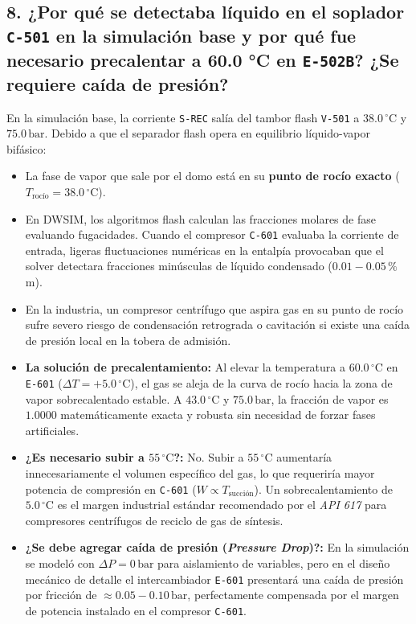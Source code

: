 \documentclass[11pt,a4paper]{article}
\begin{document}
\subsection{8. ¿Por qué se detectaba líquido en el soplador \texttt{C-501} en la simulación base y por qué fue necesario precalentar a 60.0 °C en \texttt{E-502B}? ¿Se requiere caída de presión?}
En la simulación base, la corriente \texttt{S-REC} salía del tambor flash \texttt{V-501} a $38.0\,^\circ\text{C}$ y $75.0\,\text{bar}$. Debido a que el separador flash opera en equilibrio líquido-vapor bifásico:
\begin{itemize}
    \item La fase de vapor que sale por el domo está en su \textbf{punto de rocío exacto} ($T_{\text{rocío}} = 38.0\,^\circ\text{C}$).
    \item En DWSIM, los algoritmos flash calculan las fracciones molares de fase evaluando fugacidades. Cuando el compresor \texttt{C-601} evaluaba la corriente de entrada, ligeras fluctuaciones numéricas en la entalpía provocaban que el solver detectara fracciones minúsculas de líquido condensado ($0.01 - 0.05\,\%$ m).
    \item En la industria, un compresor centrífugo que aspira gas en su punto de rocío sufre severo riesgo de condensación retrograda o cavitación si existe una caída de presión local en la tobera de admisión.
    \item \textbf{La solución de precalentamiento:} Al elevar la temperatura a \textbf{$60.0\,^\circ\text{C}$} en \texttt{E-601} ($\Delta T = +5.0\,^\circ\text{C}$), el gas se aleja de la curva de rocío hacia la zona de vapor sobrecalentado estable. A $43.0\,^\circ\text{C}$ y $75.0\,\text{bar}$, la fracción de vapor es $1.0000$ matemáticamente exacta y robusta sin necesidad de forzar fases artificiales.
    \item \textbf{¿Es necesario subir a $55\,^\circ\text{C}$?:} No. Subir a $55\,^\circ\text{C}$ aumentaría innecesariamente el volumen específico del gas, lo que requeriría mayor potencia de compresión en \texttt{C-601} ($W \propto T_{\text{succión}}$). Un sobrecalentamiento de $5.0\,^\circ\text{C}$ es el margen industrial estándar recomendado por el \textit{API 617} para compresores centrífugos de reciclo de gas de síntesis.
    \item \textbf{¿Se debe agregar caída de presión (\textit{Pressure Drop})?:} En la simulación se modeló con $\Delta P = 0\,\text{bar}$ para aislamiento de variables, pero en el diseño mecánico de detalle el intercambiador \texttt{E-601} presentará una caída de presión por fricción de $\approx 0.05 - 0.10\,\text{bar}$, perfectamente compensada por el margen de potencia instalado en el compresor \texttt{C-601}.
\end{itemize}
\end{document}
